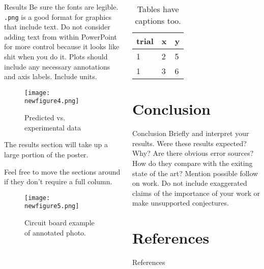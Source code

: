 \documentclass[pdf]{beamer}
\begin{document}
\begin{frame}[fragile]
\begin{columns}
\begin{column}{0.25\textwidth}
\begin{minipage}[t][\textheight]{\linewidth}
\begin{block}{Results}
Be sure the fonts are legible.  \lstinline{.png} is a good format for graphics that include text. Do not consider adding text from within PowerPoint for more control because it looks like shit when you do it.  Plots should include any necessary annotations and axis labels. Include units.
\begin{figure}
\texttt{[image: newfigure4.png]}
\caption{Predicted vs. experimental data}
\end{figure} 

The results section will take up a large portion of the poster.  
\end{block}
\vfill

\begin{block}{}
Feel free to move the sections around if they don’t require a full column. 
\begin{figure}
\texttt{[image: newfigure5.png]}
\caption{Circuit board example of annotated photo.}
\end{figure}
\end{block}
\end{minipage}
\end{column}

\begin{column}{0.25\textwidth}
\begin{minipage}[t][\textheight]{\linewidth}
\begin{table}
\caption{Tables have captions too.}
\begin{tabular}{lll}
\toprule
trial & x & y \\
\midrule
1 & 2 & 5 \\
1 & 3 & 6 \\
\bottomrule
\end{tabular}
\end{table}
\vfill

\section{Conclusion}
\begin{block}{Conclusion}\small
Briefly and interpret your results. Were these results expected? Why? Are there obvious error sources? How do they compare with the exiting state of the art?   Mention possible follow on work.   Do not include exaggerated claims of the importance of your work or make unsupported conjectures. 
\end{block}
\vfill

\section*{References}
\begin{block}{References}
\nocite{bingulac1994on, vidmar1992on}

\scriptsize
\end{block}
\vfill


\end{minipage}
\end{column}
\end{columns}
\end{frame}
\end{document}
